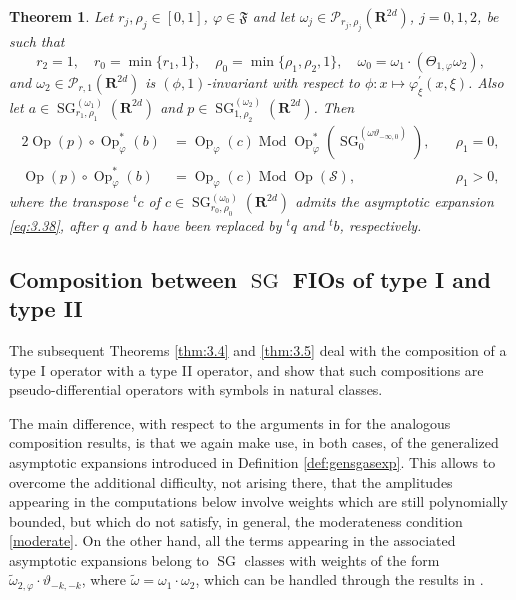 \documentclass[12pt,a4paper,reqno]{amsart}
\numberwithin{equation}{section}
\newtheorem{thm}{Theorem}
\numberwithin{thm}{section}
\theoremstyle{definition}
\theoremstyle{remark}
\begin{document}
\begin{thm}
\label{thm:3.3}
Let $r_j,\rho _j\in [0,1]$, $\varphi \in {\mathfrak{F}}$ and let $\omega _j
\in {\mathscr P}_{r_j,\rho _j}({\mathbf R^{{2d}}})$, $j=0,1,2$, be such
that
$$
r_2=1,
\quad r_0=\min\{r_1,1\} ,\quad \rho _0=\min\{ \rho_1,\rho _2,1\},
\quad \omega _0 =\omega _1\cdot (\Theta _{1,{\varphi}} \omega _2),
$$
and $\omega _2\in \mathscr{P}_{r,1}({\mathbf R^{{2d}}})$ is
$(\phi,1)$-invariant with respect to $\phi \colon
x \mapsto \varphi^\prime_\xi (x,\xi)$.
Also let $a \in {\operatorname{SG}}^{(\omega _1)} _{r_1,\rho _1}({\mathbf R^{{2d}}})$ and
$p \in {\operatorname{SG}}^{(\omega _2)}_{1,\rho _2}({\mathbf R^{{2d}}})$.
Then
\begin{alignat*}{2}
{\operatorname{Op}} (p)\circ {\operatorname{Op}} _\varphi ^*(b) &= {\operatorname{Op}}_{\varphi}(c) \operatorname{Mod}
{\operatorname{Op}} _\varphi ^*({\operatorname{SG}} ^{(\omega \vartheta _{-\infty ,0})}_0 ),& \quad \rho _1=0,
\\[1ex]
{\operatorname{Op}} (p)\circ {\operatorname{Op}} _\varphi ^*(b) &= {\operatorname{Op}}_{\varphi}(c) \operatorname{Mod}
{\operatorname{Op}} (\mathscr S ),& \quad \rho _1>0,
\end{alignat*}
where the transpose ${^t}c$ of $c \in {\operatorname{SG}}^{(\omega _0)}
_{r_0,\rho _0}({\mathbf R^{{2d}}})$ admits the asymptotic expansion
\eqref{eq:3.38}, after $q$ and $b$ have been replaced by
${^t}q$ and ${^t}b$, respectively.
\end{thm}

\par

\subsection{Composition between ${\operatorname{SG}}$ FIOs of type I and type II}
\label{subs:2.4}
The subsequent Theorems \ref{thm:3.4} and \ref{thm:3.5} deal with the
composition of a type I operator with a type II operator, and show that such compositions
are pseudo-differential operators with symbols in natural classes. 

\par

The main difference, with respect to the arguments in \cite{coriasco}
for the analogous composition results, is that we again make use, in both cases, of 
the generalized asymptotic expansions introduced in Definition \ref{def:gensgasexp}.
This allows to overcome the additional difficulty, not arising there, that the amplitudes
appearing in the computations below involve weights which are still polynomially bounded, but
which do not satisfy, in general, the moderateness condition \eqref{moderate}. On the 
other hand, all the terms appearing in the associated asymptotic expansions belong 
to ${\operatorname{SG}}$ classes with weights of the form $\widetilde{\omega}_{2,\varphi}\cdot\vartheta_{-k,-k}$,
where $\widetilde{\omega}=\omega_1\cdot\omega_2$, which can be handled through the results 
in \cite{CoTo}.
\end{document}
